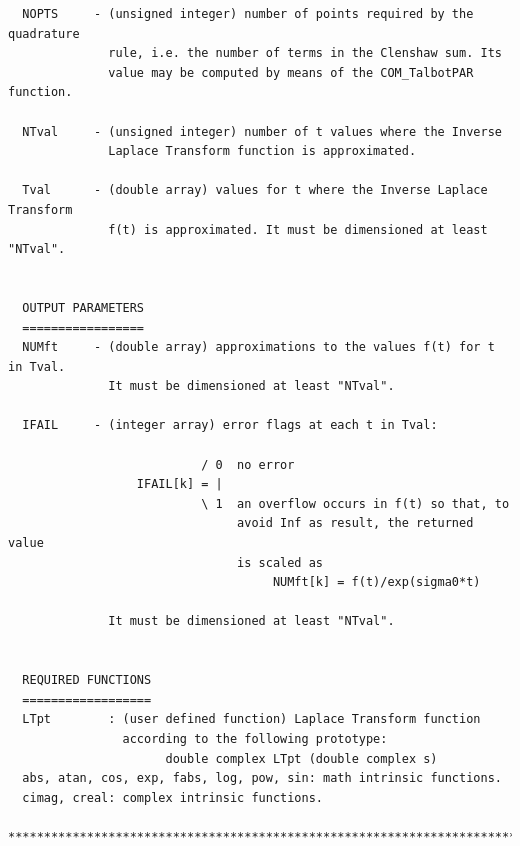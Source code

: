 \documentclass[a4paper,10pt]{report}%
\begin{document}
\begin{lstlisting}
  NOPTS     - (unsigned integer) number of points required by the quadrature
              rule, i.e. the number of terms in the Clenshaw sum. Its
              value may be computed by means of the COM_TalbotPAR function.

  NTval     - (unsigned integer) number of t values where the Inverse
              Laplace Transform function is approximated.

  Tval      - (double array) values for t where the Inverse Laplace Transform
              f(t) is approximated. It must be dimensioned at least "NTval".


  OUTPUT PARAMETERS
  =================
  NUMft     - (double array) approximations to the values f(t) for t in Tval.
              It must be dimensioned at least "NTval".

  IFAIL     - (integer array) error flags at each t in Tval:

                           / 0  no error
	              IFAIL[k] = |
                           \ 1  an overflow occurs in f(t) so that, to
                                avoid Inf as result, the returned value
                                is scaled as
                                     NUMft[k] = f(t)/exp(sigma0*t)

              It must be dimensioned at least "NTval".


  REQUIRED FUNCTIONS
  ==================
  LTpt        : (user defined function) Laplace Transform function
                according to the following prototype:
                      double complex LTpt (double complex s)
  abs, atan, cos, exp, fabs, log, pow, sin: math intrinsic functions.
  cimag, creal: complex intrinsic functions.

*****************************************************************************\
\end{lstlisting}
\end{document}
